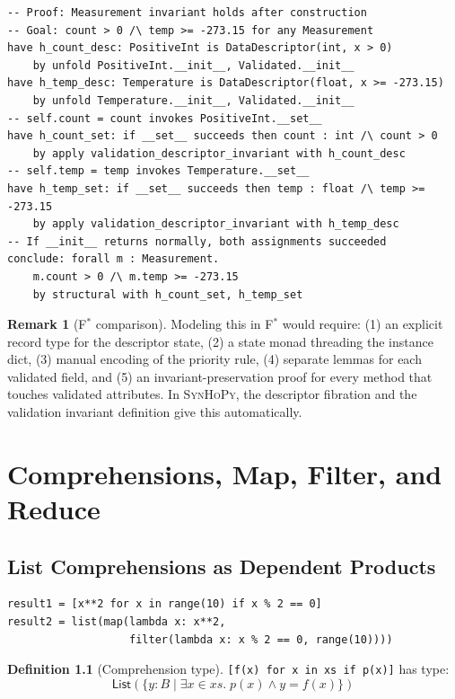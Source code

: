 \documentclass[11pt,a4paper]{report}
\theoremstyle{definition}
\newtheorem{definition}{Definition}[chapter]
\newtheorem{remark}[definition]{Remark}
\theoremstyle{plain}
\newcommand{\fstar}{F$^{*}$}
\newcommand{\synhopy}{\textsc{SynHoPy}}
\begin{document}
\begin{lstlisting}[style=proof]
-- Proof: Measurement invariant holds after construction
-- Goal: count > 0 /\ temp >= -273.15 for any Measurement
have h_count_desc: PositiveInt is DataDescriptor(int, x > 0)
    by unfold PositiveInt.__init__, Validated.__init__
have h_temp_desc: Temperature is DataDescriptor(float, x >= -273.15)
    by unfold Temperature.__init__, Validated.__init__
-- self.count = count invokes PositiveInt.__set__
have h_count_set: if __set__ succeeds then count : int /\ count > 0
    by apply validation_descriptor_invariant with h_count_desc
-- self.temp = temp invokes Temperature.__set__
have h_temp_set: if __set__ succeeds then temp : float /\ temp >= -273.15
    by apply validation_descriptor_invariant with h_temp_desc
-- If __init__ returns normally, both assignments succeeded
conclude: forall m : Measurement.
    m.count > 0 /\ m.temp >= -273.15
    by structural with h_count_set, h_temp_set
\end{lstlisting}

\begin{remark}[\fstar{} comparison]
Modeling this in \fstar{} would require: (1) an explicit record type for
the descriptor state, (2) a state monad threading the instance dict,
(3) manual encoding of the priority rule, (4) separate lemmas for each
validated field, and (5) an invariant-preservation proof for every method
that touches validated attributes.  In \synhopy{}, the descriptor fibration
and the validation invariant definition give this automatically.
\end{remark}


\chapter{Comprehensions, Map, Filter, and Reduce}
\label{ch:comprehensions}

\section{List Comprehensions as Dependent Products}

\begin{lstlisting}[style=python]
result1 = [x**2 for x in range(10) if x % 2 == 0]
result2 = list(map(lambda x: x**2,
                   filter(lambda x: x % 2 == 0, range(10))))
\end{lstlisting}

\begin{definition}[Comprehension type]
\lstinline[style=python]|[f(x) for x in xs if p(x)]| has type:
\[
  \mathsf{List}\!\left(\{y : B \mid \exists x \in \mathit{xs}.\; p(x) \wedge y = f(x)\}\right)
\]
\end{definition}
\end{document}
